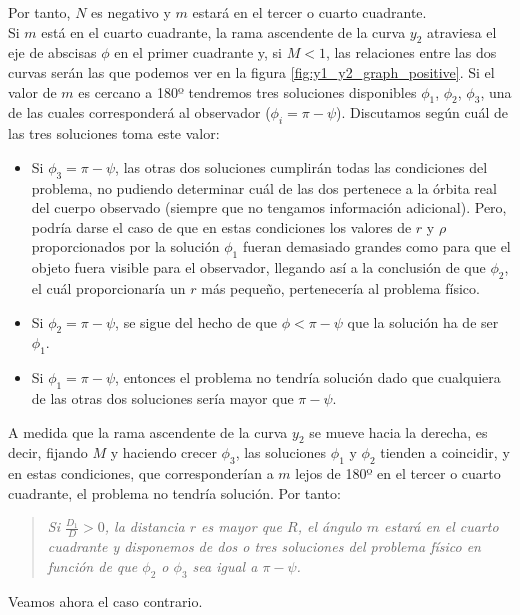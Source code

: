 \documentclass[11pt]{article}
\begin{document}
Por tanto, $N$ es negativo y $m$ estará en el tercer o cuarto cuadrante.\\

Si $m$ está en el cuarto cuadrante, la rama ascendente de la curva $y_2$ atraviesa el eje de abscisas $\phi$ en el primer cuadrante y, si $M<1$, las relaciones entre las dos curvas serán las que podemos ver en la figura \ref{fig:y1_y2_graph_positive}. Si el valor de $m$ es cercano a 180º tendremos tres soluciones disponibles $\phi_1$, $\phi_2$, $\phi_3$, una de las cuales corresponderá al observador ($\phi_i=\pi-\psi$). Discutamos según cuál de las tres soluciones toma este valor:
\begin{itemize}
\item Si $\phi_3=\pi-\psi$, las otras dos soluciones cumplirán todas las condiciones del problema, no pudiendo determinar cuál de las dos pertenece a la órbita real del cuerpo observado (siempre que no tengamos información adicional). Pero, podría darse el caso de que en estas condiciones los valores de $r$ y $\rho$ proporcionados por la solución $\phi_1$ fueran demasiado grandes como para que el objeto fuera visible para el observador, llegando así a la conclusión de que $\phi_2$, el cuál proporcionaría un $r$ más pequeño, pertenecería al problema físico.
\item Si $\phi_2=\pi-\psi$, se sigue del hecho de que $\phi<\pi-\psi$ que la solución ha de ser $\phi_1$.
\item Si $\phi_1=\pi-\psi$, entonces el problema no tendría solución dado que cualquiera de las otras dos soluciones sería mayor que $\pi-\psi$.
\end{itemize} 

A medida que la rama ascendente de la curva $y_2$ se mueve hacia la derecha, es decir, fijando $M$ y haciendo crecer $\phi_3$, las soluciones $\phi_1$ y $\phi_2$ tienden a coincidir, y en estas condiciones, que corresponderían a $m$ lejos de 180º en el tercer o cuarto cuadrante, el problema no tendría solución. Por tanto:
\begin{quote}
\textit{Si $\frac{D_1}{D}>0$, la distancia $r$ es mayor que $R$, el ángulo $m$ estará en el cuarto cuadrante y disponemos de dos o tres soluciones del problema físico en función de que $\phi_2$ o $\phi_3$ sea igual a $\pi-\psi$.}\\
\end{quote}

Veamos ahora el caso contrario. 
\end{document}

